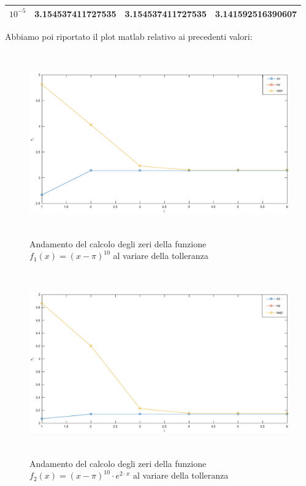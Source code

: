 \begin{flushleft}
\begin{center}
\begin{tabular}{|c|c|c|c|}
$10^{-5}$ & 3.154537411727535 & 3.154537411727535 & 3.141592516390607 \\
\hline
\end{tabular}
\end{center}
Abbiamo poi riportato il plot matlab relativo ai precedenti valori:
\begin{figure}[H]
\includegraphics[width=500px, height=300px]{plot/fes24a.eps}
\caption{Andamento del calcolo degli zeri della funzione $f_1(x)=(x-\pi)^{10}$ al variare della tolleranza}
\end{figure}
\begin{figure}[H]
\includegraphics[width=500px, height=300px]{plot/fes24b.eps}
\caption{Andamento del calcolo degli zeri della funzione $f_2(x) = (x-\pi)^{10} \cdot e^{2\cdot x}$ al variare della tolleranza}
\end{figure}
\end{flushleft}